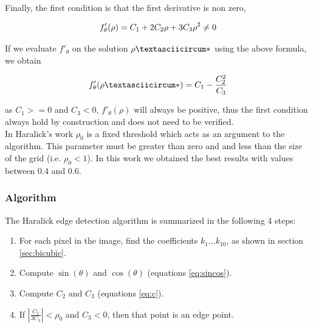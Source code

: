 \documentclass{ipol}
\numberwithin{equation}{section}
\numberwithin{table}{section}
\begin{document}
Finally,  the first condition is that the first derivative is non zero, 

\begin{equation}\label{eq:cond:first}
f'_{\theta}(\rho) = C_1 + 2C_2\rho + 3C_3\rho^2 \neq 0 \\
\end{equation}

If we evaluate $f'_{\theta}$ on the solution $\rhoˆ*$ using the above formula, we obtain

\begin{equation}\label{eq:cond:first}
f'_{\theta}(\rhoˆ*) = C_1 - \frac{C_2^2}{C_3}  \\
\end{equation}

as $C_1>=0$ and $C_3<0$, $f'_{\theta}(\rho)$ will always be positive, thus the first condition always hold by construction and does not need to be verified.\\

In Haralick's work $\rho_0$ is a fixed threshold which acts as an argument to the algorithm.
This parameter must be greater than zero and and less than the size of the grid (i.e. $\rho_0<1$). In this work we obtained the best results with values between $0.4$ and $0.6$.\\


\subsubsection{Algorithm}

The Haralick edge detection algorithm is summarized in the following 4 steps:

\begin{enumerate}
	\item For each pixel in the image, find the coefficients $k_1 \hdots k_{10}$, as shown in section \ref{sec:bicubic}.
	\item Compute $\sin(\theta)$ and $\cos(\theta)$ (equations \ref{eq:sincos}).
	\item Compute $C_2$ and $C_3$ (equations \ref{eq:c}).
	\item If $\left| \frac{C_2}{3C_3} \right| < \rho_0$ and $C_3 < 0$, then that point is an edge point.
\end{enumerate}

\end{document}
